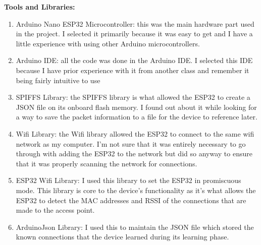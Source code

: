 \documentclass[letterpaper, 11pt]{article}
\newcommand{\secHeader}[1]{\vspace{2mm} \noindent \textbf{#1:}\vspace{-4mm}}
\begin{document}
\secHeader{Tools and Libraries}
\vspace{5mm}
\begin{enumerate}
    \item Arduino Nano ESP32 Microcontroller: this was the main hardware part used in the project. I selected it primarily because it was easy to get and I have a little experience with using other 
    Arduino microcontrollers.
    \item Arduino IDE: all the code was done in the Arduino IDE. I selected this IDE because I have prior experience with it from another class and remember it being fairly intuitive to use
    \item SPIFFS Library: the SPIFFS library is what allowed the ESP32 to create a JSON file on its onboard flash memory. I found out about it while looking for a way to save the packet information
    to a file for the device to reference later.
    \item Wifi Library: the Wifi library allowed the ESP32 to connect to the same wifi network as my computer. I'm not sure that it was entirely necessary to go through with adding the ESP32 to the 
    network but did so anyway to ensure that it was properly scanning the network for connections.
    \item ESP32 Wifi Library: I used this library to set the ESP32 in promiscuous mode. This library is core to the device's functionality as it's what allows the ESP32 to detect the 
    MAC addresses and RSSI of the connections that are made to the access point.
    \item ArduinoJson Library: I used this to maintain the JSON file which stored the known connections that the device learned during its learning phase.
\end{enumerate}
\end{document}

